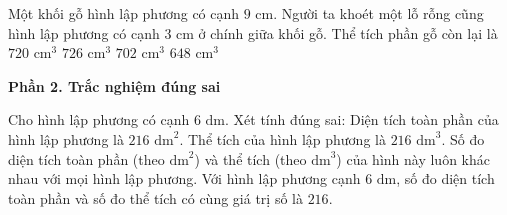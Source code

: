 \begin{ex} %
Một khối gỗ hình lập phương có cạnh $9\text{ cm}$. Người ta khoét một lỗ rỗng cũng hình lập phương có cạnh $3\text{ cm}$ ở chính giữa khối gỗ. Thể tích phần gỗ còn lại là
\choice
{$720\text{ cm}^3$}
{$726\text{ cm}^3$}
{\True $702\text{ cm}^3$}
{$648\text{ cm}^3$}
\end{ex}

\textbf{Phần 2. Trắc nghiệm đúng sai}

\begin{ex} %
Cho hình lập phương có cạnh $6\text{ dm}$. Xét tính đúng sai:
\choiceTF
{\True Diện tích toàn phần của hình lập phương là $216\text{ dm}^2$.}
{\True Thể tích của hình lập phương là $216\text{ dm}^3$.}
{Số đo diện tích toàn phần (theo $\text{dm}^2$) và thể tích (theo $\text{dm}^3$) của hình này luôn khác nhau với mọi hình lập phương.}
{\True Với hình lập phương cạnh $6\text{ dm}$, số đo diện tích toàn phần và số đo thể tích có cùng giá trị số là $216$.}
\end{ex}

